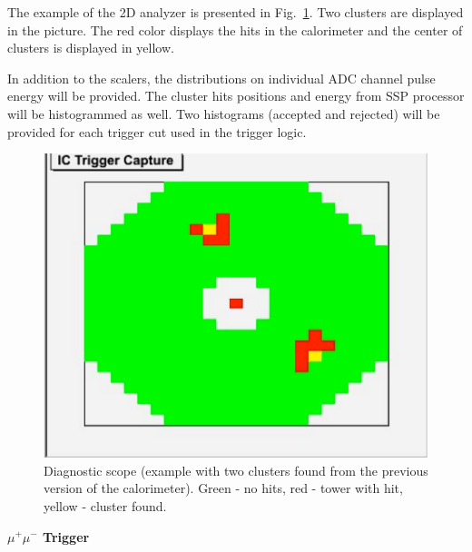 The example of the 2D analyzer is presented in Fig.~\ref{fig:dvcs_2_cluster}. Two clusters are displayed
in the picture. The red color displays the hits in the calorimeter and  the center of clusters is displayed in yellow.

In addition to the scalers, the distributions on individual ADC channel pulse energy will be provided.
The cluster hits positions and energy from SSP processor will be histogrammed as well. Two histograms (accepted and rejected) will be provided for each trigger cut used in the trigger logic.



\begin{figure}[t]
\includegraphics[scale=0.8]{daq_trigger/figures/dvcs_2_cluster}
\caption{\small{Diagnostic scope (example with two clusters found from the previous version of the calorimeter). Green - no hits, red - tower with hit, yellow - cluster found.}}
\label{fig:dvcs_2_cluster}
\end{figure}






{\bf $\mu^+\mu^-$ Trigger} 

